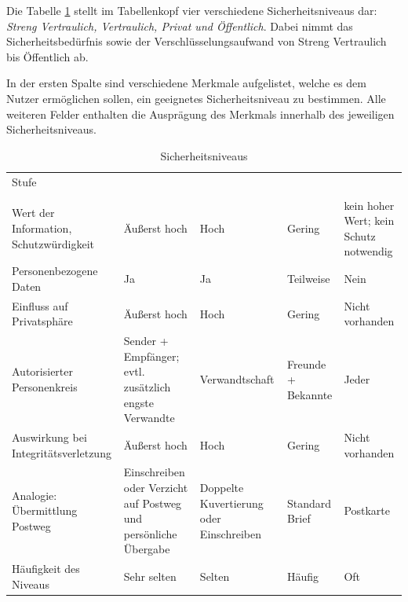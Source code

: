 \documentclass  [paper=a4,
				fontsize=12pt,
				listof=totoc,
				bibliography=totoc
				]{scrreprt}
\begin{document}
		Die Tabelle \ref{tab:sicherheitsniveaus} stellt im Tabellenkopf vier verschiedene Sicherheitsniveaus dar: \textit{Streng Vertraulich, Vertraulich, Privat und Öffentlich}. Dabei nimmt das Sicherheitsbedürfnis sowie der Verschlüsselungsaufwand von Streng Vertraulich bis Öffentlich ab.
		
		In der ersten Spalte sind verschiedene Merkmale aufgelistet, welche es dem Nutzer ermöglichen sollen, 
		ein geeignetes Sicherheitsniveau zu bestimmen.
		Alle weiteren Felder enthalten die Ausprägung des Merkmals innerhalb des jeweiligen Sicherheitsniveaus.
		\medskip\\
		
	\pagebreak

	\begin{table}
		\small
		\centering
		\begin{tabularx}{\textwidth}{|>{\raggedright\arraybackslash}X|>{\raggedright\arraybackslash}X|>{\raggedright\arraybackslash}X|>{\raggedright\arraybackslash}X|>{\raggedright\arraybackslash}X|} 
			\hline Stufe & \multicolumn{1}{c|}{\textbf{4}} & \multicolumn{1}{c|}{\textbf{3}} & \multicolumn{1}{c|}{\textbf{2}} & \multicolumn{1}{c|}{\textbf{1}} \\
			  & \multicolumn{1}{c|}{\textbf{Streng Vertraulich}} & \multicolumn{1}{c|}{\textbf{Vertraulich}} & \multicolumn{1}{c|}{\textbf{Privat}} & \multicolumn{1}{c|}{\textbf{Öffentlich}} \\ 
			\hline Wert der Information, Schutzwürdigkeit & Äußerst hoch & Hoch & Gering & kein hoher Wert; kein Schutz notwendig \\ 
			\hline Personenbezogene Daten & Ja & Ja & Teilweise & Nein \\ 
			\hline Einfluss auf Privatsphäre & Äußerst hoch & Hoch & Gering & Nicht vorhanden \\ 
			\hline Autorisierter Personenkreis & Sender + Empfänger; evtl. zusätzlich engste Verwandte & Verwandtschaft & Freunde + Bekannte & Jeder \\ 
			\hline Auswirkung bei Integritätsverletzung & Äußerst hoch & Hoch & Gering & Nicht vorhanden \\
			\hline Analogie: Übermittlung Postweg & Einschreiben oder Verzicht auf Postweg und persönliche Übergabe & Doppelte Kuvertierung oder Einschreiben & Standard Brief & Postkarte \\
			\hline Häufigkeit des Niveaus & Sehr selten & Selten & Häufig & Oft \\  
			\hline
		\end{tabularx} 
		\caption{Sicherheitsniveaus}
		\label{tab:sicherheitsniveaus}
	\end{table}
		
\end{document}
